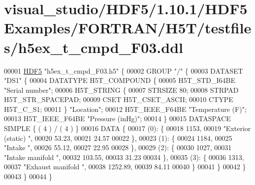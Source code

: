 \hypertarget{visual__studio_2_h_d_f5_21_810_81_2_h_d_f5_examples_2_f_o_r_t_r_a_n_2_h5_t_2testfiles_2h5ex__t__cmpd___f03_8ddl_source}{}\section{visual\+\_\+studio/\+H\+D\+F5/1.10.1/\+H\+D\+F5\+Examples/\+F\+O\+R\+T\+R\+A\+N/\+H5\+T/testfiles/h5ex\+\_\+t\+\_\+cmpd\+\_\+\+F03.ddl}
\label{visual__studio_2_h_d_f5_21_810_81_2_h_d_f5_examples_2_f_o_r_t_r_a_n_2_h5_t_2testfiles_2h5ex__t__cmpd___f03_8ddl_source}

\begin{DoxyCode}
00001 \hyperlink{namespace_h_d_f5}{HDF5} \textcolor{stringliteral}{"h5ex\_t\_cmpd\_F03.h5"} \{
00002 GROUP \textcolor{stringliteral}{"/"} \{
00003    DATASET \textcolor{stringliteral}{"DS1"} \{
00004       DATATYPE  H5T\_COMPOUND \{
00005          H5T\_STD\_I64BE \textcolor{stringliteral}{"Serial number"};
00006          H5T\_STRING \{
00007             STRSIZE 80;
00008             STRPAD H5T\_STR\_SPACEPAD;
00009             CSET H5T\_CSET\_ASCII;
00010             CTYPE H5T\_C\_S1;
00011          \} \textcolor{stringliteral}{"Location"};
00012          H5T\_IEEE\_F64BE \textcolor{stringliteral}{"Temperature (F)"};
00013          H5T\_IEEE\_F64BE \textcolor{stringliteral}{"Pressure (inHg)"};
00014       \}
00015       DATASPACE  SIMPLE \{ ( 4 ) / ( 4 ) \}
00016       DATA \{
00017       (0): \{
00018             1153,
00019             \textcolor{stringliteral}{"Exterior (static)                                                               "},
00020             53.23,
00021             24.57
00022          \},
00023       (1): \{
00024             1184,
00025             \textcolor{stringliteral}{"Intake                                                                          "},
00026             55.12,
00027             22.95
00028          \},
00029       (2): \{
00030             1027,
00031             \textcolor{stringliteral}{"Intake manifold                                                                 "},
00032             103.55,
00033             31.23
00034          \},
00035       (3): \{
00036             1313,
00037             \textcolor{stringliteral}{"Exhaust manifold                                                                "},
00038             1252.89,
00039             84.11
00040          \}
00041       \}
00042    \}
00043 \}
00044 \}
\end{DoxyCode}
